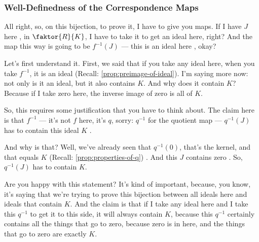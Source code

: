 \begin{hidden}
\end{hidden}

\begin{proofWrapper}
\subsubsection{Well-Definedness of the Correspondence Maps}

\begin{speech}[00:20:07 - 00:22:05]
All right, so, on this bijection, to prove it, I have to give you maps. If I have $J$ here , in $\faktor{R}{K}$, I have to take it to get an ideal here, right?  And the map this way is going to be $f^{-1}(J)$ --- this is an ideal here , okay?

Let's first understand it. First, we said that if you take any ideal here, when you take $f^{-1}$, it is an ideal (Recall: \cref{prop:preimage-of-ideal}). I'm saying more now: not only is it an ideal, but it also contains $K$. And why does it contain $K$? Because if I take zero here, the inverse image of zero is all of $K$.

So, this requires some justification that you have to think about. The claim here is that $f^{-1}$ --- it's not $f$ here, it's $q$, sorry:  $q^{-1}$ for the quotient map --- $q^{-1}(J)$ has to contain this ideal $K$ .

And why is that? Well, we've already seen that $q^{-1}(0)$, that's the kernel, and that equals $K$ (Recall: \cref{prop:properties-of-q}) . And this $J$ contains zero . So, $q^{-1}(J)$ has to contain $K$.

Are you happy with this statement? It's kind of important, because, you know, it's saying that we're trying to prove this bijection between all ideals here and ideals that contain $K$. And the claim is that if I take any ideal here and I take this $q^{-1}$ to get it to this side, it will always contain $K$, because this $q^{-1}$ certainly contains all the things that go to zero, because zero is in here, and the things that go to zero are exactly $K$.
\end{speech}


\end{proofWrapper}
